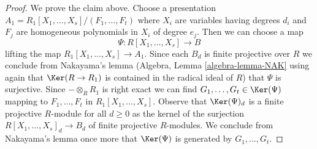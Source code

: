 \begin{proof}
\medskip\noindent
We prove the claim above.
Choose a presentation $A_1 = R_1[X_1, \ldots, X_s]/(F_1, \ldots, F_t)$
where $X_i$ are variables having degrees $d_i$ and $F_j$
are homogeneous polynomials in $X_i$ of degree $e_j$.
Then we can choose a map
$$
\Psi : R[X_1, \ldots, X_s] \longrightarrow B
$$
lifting the map $R_1[X_1, \ldots, X_s] \to A_1$. Since each $B_d$
is finite projective over $R$ we conclude from 
Nakayama's lemma (Algebra, Lemma \ref{algebra-lemma-NAK}
using again that $\Ker(R \to R_1)$ is contained in the radical
ideal of $R$) that $\Psi$ is surjective. Since $- \otimes_R R_1$ is right
exact we can find $G_1, \ldots, G_t \in \Ker(\Psi)$
mapping to $F_1, \ldots, F_t$ in $R_1[X_1, \ldots, X_s]$.
Observe that $\Ker(\Psi)_d$ is a finite projective $R$-module
for all $d \geq 0$ as the kernel of the surjection
$R[X_1, \ldots, X_s]_d \to B_d$ of finite projective $R$-modules.
We conclude from Nakayama's lemma once more that 
$\Ker(\Psi)$ is generated by $G_1, \ldots, G_t$.
\end{proof}















